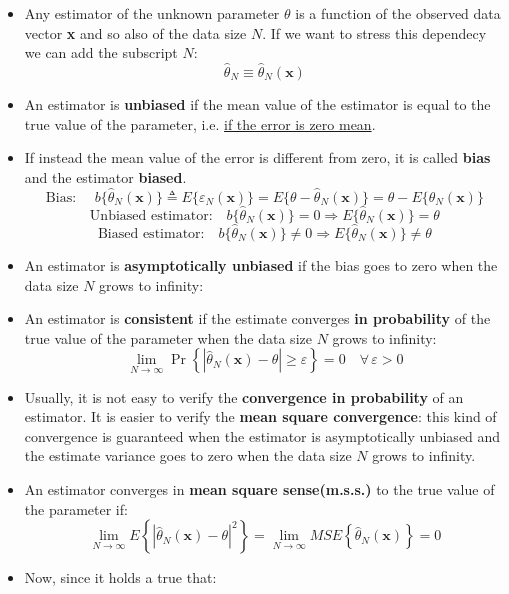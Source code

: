 \begin{itemize}
\item Any estimator of the unknown parameter \(\theta\) is a function of the observed data vector \textbf{x} and so also of the data size \(N\). If we want to stress this dependecy we can add the subscript \(N\):
\[
\hat{\theta}_N\equiv\hat{\theta}_N(\textbf{x})
\]
\item An estimator is \textbf{unbiased} if the mean value of the estimator is equal to the true value of the parameter, i.e. \underline{if the error is zero mean}.
\item If instead the mean value of the error is different from zero, it is called \textbf{bias} and the estimator \textbf{biased}.
\[
\text{Bias: } \quad b\{\hat{\theta}_N(\mathbf{x})\} \triangleq E\{\varepsilon_N(\mathbf{x})\}
= E\{\theta - \hat{\theta}_N(\mathbf{x})\}
= \theta - E\{\hat{\theta}_N(\mathbf{x})\}
\]
\[
\text{Unbiased estimator:} \quad b\{\hat{\theta}_N(\mathbf{x})\} = 0
\Longrightarrow E\{\hat{\theta}_N(\mathbf{x})\} = \theta
\]\[
\text{Biased estimator:} \quad b\{\hat{\theta}_N(\mathbf{x})\} \neq 0
\Longrightarrow E\{\hat{\theta}_N(\mathbf{x})\} \neq \theta
\]
\item An estimator is \textbf{asymptotically unbiased} if the bias goes to zero when the data size \(N\) grows to infinity:


\item An estimator is \textbf{consistent} if the estimate converges \textbf{in probability} of the true value of the parameter when the data size \(N\) grows to infinity:
\[
\lim_{N \to \infty} \Pr \left\{ \left| \hat{\theta}_N(\mathbf{x}) - \theta \right| \geq \varepsilon \right\} = 0
\quad \forall\, \varepsilon > 0
\]
\item Usually, it is not easy to verify the \textbf{convergence in probability} of an estimator. It is easier to verify the \textbf{mean square convergence}: this kind of convergence is guaranteed when the estimator is asymptotically unbiased and the estimate variance goes to zero when the data size \(N\) grows to infinity.
\item An estimator converges in \textbf{mean square sense(m.s.s.)} to the true value of the parameter if:
\[
\lim_{N \to \infty} E\left\{ \left| \hat{\theta}_N(\mathbf{x}) - \theta \right|^2 \right\}
= \lim_{N \to \infty} MSE\left\{ \hat{\theta}_N(\mathbf{x}) \right\} = 0
\]
\item Now, since it holds a true that:


\end{itemize}
